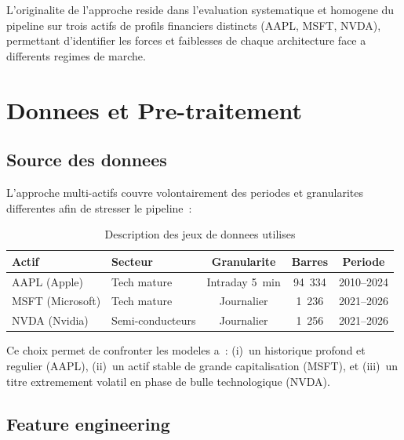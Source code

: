 \documentclass[12pt, a4paper]{article}
\begin{document}
L'originalite de l'approche reside dans l'evaluation systematique et homogene du pipeline sur trois actifs de profils financiers distincts (AAPL, MSFT, NVDA), permettant d'identifier les forces et faiblesses de chaque architecture face a differents regimes de marche.

\section{Donnees et Pre-traitement}

\subsection{Source des donnees}

L'approche multi-actifs couvre volontairement des periodes et granularites differentes afin de stresser le pipeline~:

\begin{table}[H]
\centering
\caption{Description des jeux de donnees utilises}
\begin{tabular}{llccc}
\toprule
\textbf{Actif} & \textbf{Secteur} & \textbf{Granularite} & \textbf{Barres} & \textbf{Periode} \\
\midrule
AAPL (Apple)      & Tech mature   & Intraday 5~min & 94~334 & 2010--2024 \\
MSFT (Microsoft)  & Tech mature   & Journalier     & 1~236  & 2021--2026 \\
NVDA (Nvidia)     & Semi-conducteurs & Journalier  & 1~256  & 2021--2026 \\
\bottomrule
\end{tabular}
\end{table}

Ce choix permet de confronter les modeles a~: (i)~un historique profond et regulier (AAPL), (ii)~un actif stable de grande capitalisation (MSFT), et (iii)~un titre extremement volatil en phase de bulle technologique (NVDA).

\subsection{Feature engineering}
\end{document}
